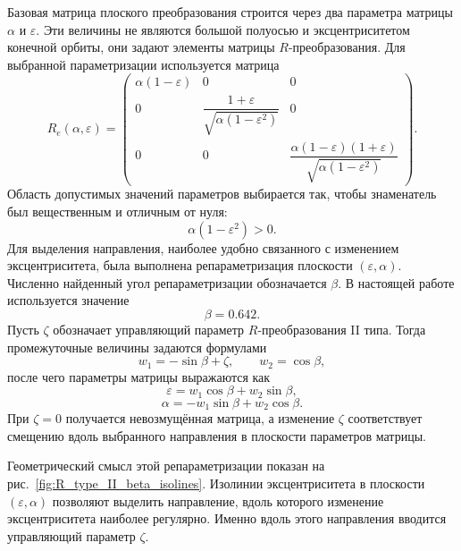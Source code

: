 Базовая матрица плоского преобразования строится через два параметра матрицы \(\alpha\) и \(\varepsilon\). Эти величины не являются большой полуосью и эксцентриситетом конечной орбиты, они задают элементы матрицы \(R\)-преобразования. Для выбранной параметризации используется матрица
\begin{equation}
R_e(\alpha,\varepsilon)
=
\begin{pmatrix}
	\alpha(1-\varepsilon) & 0 & 0\\
	0 & \dfrac{1+\varepsilon}{\sqrt{\alpha(1-\varepsilon^2)}} & 0\\
	0 & 0 & \dfrac{\alpha(1-\varepsilon)(1+\varepsilon)}{\sqrt{\alpha(1-\varepsilon^2)}}
\end{pmatrix}.
\end{equation}
Область допустимых значений параметров выбирается так, чтобы знаменатель был вещественным и отличным от нуля:
\begin{equation}
\alpha(1-\varepsilon^2)>0.
\end{equation}
Для выделения направления, наиболее удобно связанного с изменением эксцентриситета, была выполнена репараметризация плоскости \((\varepsilon,\alpha)\). Численно найденный угол репараметризации обозначается \(\beta\). В настоящей работе используется значение
\begin{equation}
\beta=0.642.
\end{equation}
Пусть \(\zeta\) обозначает управляющий параметр \(R\)-преобразования II типа. Тогда промежуточные величины задаются формулами
\begin{equation}
w_1=-\sin\beta+\zeta,
\qquad
w_2=\cos\beta,
\end{equation}
после чего параметры матрицы выражаются как
\begin{equation}
\varepsilon=w_1\cos\beta+w_2\sin\beta,
\end{equation}
\begin{equation}
\alpha=-w_1\sin\beta+w_2\cos\beta.
\end{equation}
При \(\zeta=0\) получается невозмущённая матрица, а изменение \(\zeta\) соответствует смещению вдоль выбранного направления в плоскости параметров матрицы.

Геометрический смысл этой репараметризации показан на рис.~\ref{fig:R_type_II_beta_isolines}. Изолинии эксцентриситета в плоскости \((\varepsilon,\alpha)\) позволяют выделить направление, вдоль которого изменение эксцентриситета наиболее регулярно. Именно вдоль этого направления вводится управляющий параметр \(\zeta\).

